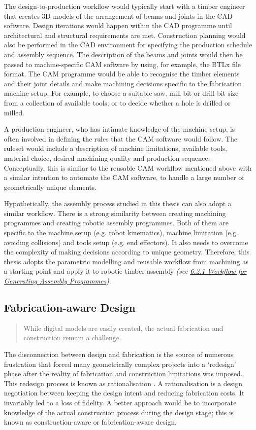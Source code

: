 The design-to-production workflow would typically start with a timber engineer that creates 3D models of the arrangement of beams and joints in the CAD software. Design iterations would happen within the CAD programme until architectural and structural requirements are met. Construction planning would also be performed in the CAD environment for specifying the production schedule and assembly sequence. The description of the beams and joints would then be passed to machine-specific CAM software by using, for example, the BTLx file format. The CAM programme would be able to recognise the timber elements and their joint details and make machining decisions specific to the fabrication machine setup. For example, to choose a suitable saw, mill bit or drill bit size from a collection of available tools; or to decide whether a hole is drilled or milled.

A production engineer, who has intimate knowledge of the machine setup, is often involved in defining the rules that the CAM software would follow. The ruleset would include a description of machine limitations, available tools, material choice, desired machining quality and production sequence. Conceptually, this is similar to the reusable CAM workflow mentioned above with a similar intention to automate the CAM software, to handle a large number of geometrically unique elements. 

Hypothetically, the assembly process studied in this thesis can also adopt a similar workflow. There is a strong similarity between creating machining programmes and creating robotic assembly programmes. Both of them are specific to the machine setup (e.g. robot kinematics), machine limitation (e.g. avoiding collisions) and tools setup (e.g. end effectors). It also needs to overcome the complexity of making decisions according to unique geometry. Therefore, this thesis adopts the parametric modelling and reusable workflow from machining as a starting point and apply it to robotic timber assembly \textit{(see \ul{6.2.1 Workflow for Generating Assembly Programmes})}. 

\subsection{Fabrication-aware Design}

\begin{quote}
While digital models are easily created, the actual fabrication and construction remain a challenge. \parencite{pottmannArchitecturalGeometryFabricationAware2013}
\end{quote}
The disconnection between design and fabrication is the source of numerous frustration that forced many geometrically complex projects into a ‘redesign’ phase after the reality of fabrication and construction limitations was imposed. This redesign process is known as rationalisation \parencite{pottmannArchitecturalGeometryFabricationAware2013}. A rationalisation is a design negotiation between keeping the design intent and reducing fabrication costs. It invariably led to a loss of fidelity. A better approach would be to incorporate knowledge of the actual construction process during the design stage; this is known as construction-aware or fabrication-aware design.

